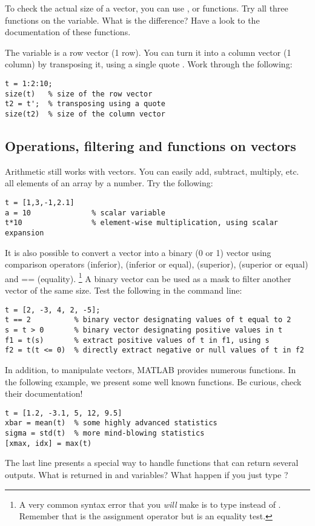 \documentclass{article}
\begin{document}
To check the actual size of a vector, you can use ,  or  functions.
Try all three functions on the  variable. What is the difference?
Have a look to the documentation of these functions.

The variable  is a row vector (1 row).
You can turn it into a column vector (1 column) by transposing it, using a single quote .
Work through the following:
\begin{lstlisting}
t = 1:2:10;
size(t)   % size of the row vector
t2 = t';  % transposing using a quote
size(t2)  % size of the column vector
\end{lstlisting}

\subsection{Operations, filtering and functions on vectors}

Arithmetic still works with vectors.
You can easily add, subtract, multiply, etc. all elements of an array by a number.
Try the following:
\begin{lstlisting}
t = [1,3,-1,2.1]
a = 10              % scalar variable
t*10                % element-wise multiplication, using scalar expansion
\end{lstlisting}

It is also possible to convert a vector into a binary (0 or 1) vector using comparison operators \mcode{<} (inferior), \mcode{<=} (inferior or equal), \mcode{>} (superior), \mcode{>=} (superior or equal) and {==} (equality).%
\footnote{%
  A very common syntax error that you \emph{will} make is to type  instead of .
  Remember that \mcode{=} is the assignment operator but \mcode{==} is an equality test.
}
A binary vector can be used as a mask to filter another vector of the same size.
Test the following in the command line:
\begin{lstlisting}
t = [2, -3, 4, 2, -5];
t == 2          % binary vector designating values of t equal to 2
s = t > 0       % binary vector designating positive values in t
f1 = t(s)       % extract positive values of t in f1, using s
f2 = t(t <= 0)  % directly extract negative or null values of t in f2
\end{lstlisting}

In addition, to manipulate vectors, MATLAB provides numerous functions.
In the following example, we present some well known functions.
Be curious, check their documentation!
\begin{lstlisting}
t = [1.2, -3.1, 5, 12, 9.5]
xbar = mean(t)  % some highly advanced statistics
sigma = std(t)  % more mind-blowing statistics
[xmax, idx] = max(t)
\end{lstlisting}
The last line presents a special way to handle functions that can return several outputs.
What is returned in  and  variables?
What happen if you just type ?
\end{document}
